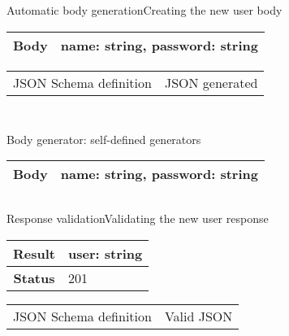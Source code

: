 \begin{frame}{Automatic body generation}{Creating the new user body}
  \begin{center}
    \begin{tabular}{| c | l |}
      \hline
      \textbf{Body} & name: string, password: string \\ \hline
    \end{tabular}
  \end{center}
  \begin{tabular}{p{6cm} l}
    JSON Schema definition&JSON generated
  \end{tabular}
  \begin{minipage}{0.5\textwidth}
    \centering
    \inputminted{js}{./code/example1_body.jsch}
  \end{minipage}
  \vline
  \pause
  \hspace{10pt}
  \begin{minipage}{0.4\textwidth}
    \centering
    \inputminted{js}{./code/example1_body-gen.jsch}
  \end{minipage}

  \centering

\end{frame}

\begin{frame}{Body generator: self-defined generators}
  \begin{tabular}{| c | l |}
    \hline
    \textbf{Body} & name: string, password: string \\ \hline
  \end{tabular}
  \centering
  \inputminted{js}{./code/example1_body_custom_generators.jsch}
\end{frame}

\begin{frame}{Response validation}{Validating the new user response}
  \begin{center}
    \begin{tabular}{| c | l |}
      \hline
      \textbf{Result}    & user: string \\ \hline
      \textbf{Status}    & 201 \\ \hline
    \end{tabular}
  \end{center}
  \begin{tabular}{p{6cm} l}
    JSON Schema definition & Valid JSON
  \end{tabular}

  \begin{minipage}{0.5\textwidth}
    \centering
    \inputminted{js}{./code/example1_new_user_response.jsch}
  \end{minipage}
  \vline
  \pause
  \hspace{10pt}
  \begin{minipage}{0.4\textwidth}
    \centering
    \inputminted{js}{./code/example1_new_user_val.jsch}
  \end{minipage}

  \centering
\end{frame}


